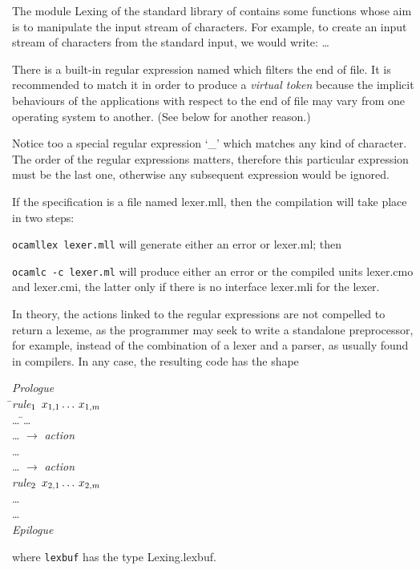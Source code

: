 \documentclass[12pt,a4paper]{article}
\begin{document}
The module \textsf{Lexing} of the standard library of \OCaml contains
some functions whose aim is to manipulate the input stream of
characters. For example, to create an input stream of characters from
the standard input, we would write: \Xlet {} \equal{}
  \Xin{} \ldots

There is a built\hyp{}in regular expression named  which
filters the end of file. It is recommended to match it in order to
produce a \emph{virtual token} \Teof because the implicit behaviours
of the applications with respect to the end of file may vary from one
operating system to another. (See below for another reason.)

Notice too a special regular expression `\textsf{\large \_}' which
matches any kind of character. The order of the regular expressions
matters, therefore this particular expression must be the last one,
otherwise any subsequent expression would be ignored.

If the \ocamllex specification is a file named \textsf{lexer.mll},
then the compilation will take place in two steps:
\begin{enumerate*}

   \item \texttt{ocamllex lexer.mll} will generate either an error or
     \textsf{lexer.ml}; then

   \item \texttt{ocamlc -c lexer.ml} will produce either an error or
     the compiled units \textsf{lexer.cmo} and \textsf{lexer.cmi}, the
     latter only if there is no interface \textsf{lexer.mli} for the
     lexer.

\end{enumerate*}
In theory, the actions linked to the regular expressions are not
compelled to return a lexeme, as the programmer may seek to write a
standalone preprocessor, for example, instead of the combination of a
lexer and a parser, as usually found in compilers. In any case, the
resulting \OCaml code has the shape
\begin{tabbing}
\emph{Prologue}\\
\Xlet \= \Xrec \emph{rule}\(\sb{1}\) \(x\sb{1,1} \dots\, x\sb{1,m}\)  \equal\\
\> \ldots{} \= \Xmatch \ldots{} \Xwith\\
\>\> \; \ldots{} \(\rightarrow\) \emph{action}\\
\>\> \vbar{} \ldots{}\\
\>\> \vbar{} \ldots{} \(\rightarrow\) \emph{action}\\
\Xand \emph{rule}\(\sb{2}\) \(x\sb{2,1} \dots\, x\sb{2,m}\)
 \equal\\
\> \ldots\\
\Xand \ldots\\
\emph{Epilogue}
\end{tabbing}
where \texttt{lexbuf} has the type \textsf{Lexing.lexbuf}.
\end{document}

